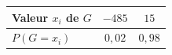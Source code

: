 \begingroup\renewcommand{\arraystretch}{1.35}
\begin{tabular}{@{}lcc@{}}\toprule
Valeur $x_i$ de $G$ & $-485$ & $15$\\\midrule
$P(G=x_i)$ & $0{,}02$ & $0{,}98$\\
\bottomrule\end{tabular}\endgroup

\par\smallskip{}
